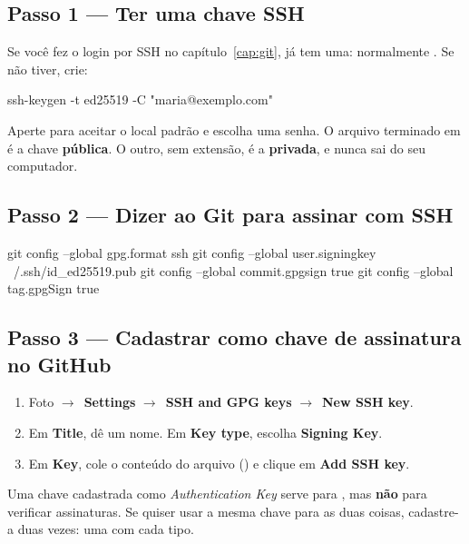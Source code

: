 \subsection{Passo 1 — Ter uma chave SSH}

Se você fez o login por SSH no capítulo~\ref{cap:git}, já tem uma: normalmente . Se não tiver, crie:

\begin{bashcode}
ssh-keygen -t ed25519 -C "maria@exemplo.com"
\end{bashcode}

Aperte  para aceitar o local padrão e escolha uma senha. O arquivo terminado em  é a chave \textbf{pública}. O outro, sem extensão, é a \textbf{privada}, e nunca sai do seu computador.

\subsection{Passo 2 — Dizer ao Git para assinar com SSH}

\begin{bashcode}
git config --global gpg.format ssh
git config --global user.signingkey ~/.ssh/id_ed25519.pub
git config --global commit.gpgsign true
git config --global tag.gpgSign true
\end{bashcode}

\subsection{Passo 3 — Cadastrar como chave de assinatura no GitHub}

\begin{enumerate}
  \item Foto \(\rightarrow\)\ \textbf{Settings} \(\rightarrow\)\ \textbf{SSH and GPG keys} \(\rightarrow\)\ \textbf{New SSH key}.
  \item Em \textbf{Title}, dê um nome. Em \textbf{Key type}, escolha \textbf{Signing Key}.
  \item Em \textbf{Key}, cole o conteúdo do arquivo  () e clique em \textbf{Add SSH key}.
\end{enumerate}

\begin{aviso}
Uma chave cadastrada como \emph{Authentication Key} serve para , mas \textbf{não} para verificar assinaturas. Se quiser usar a mesma chave para as duas coisas, cadastre-a duas vezes: uma com cada tipo.
\end{aviso}

